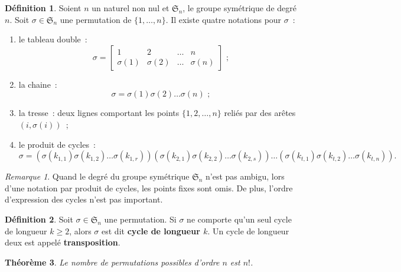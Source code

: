 \documentclass{article}
\newtheorem{thm}{Théorème}[section]
\theoremstyle{definition}
\newtheorem{déf}[thm]{Définition}
\theoremstyle{remark}
\newtheorem*{rmq}{Remarque}
\begin{document}
		\begin{déf} Soient $n$ un naturel non nul et $\mathfrak{S}_n$, le groupe symétrique de degré $n$. Soit $\sigma \in \mathfrak{S}_n$ une permutation de
		$\{1, \dotsc, n\}$. Il existe quatre notations pour $\sigma$~:

		\begin{enumerate}
			\item le tableau double~: \[\sigma = \begin{bmatrix}1 & 2 & \ldots & n \\ \sigma(1) & \sigma(2) & \ldots & \sigma(n) \end{bmatrix}\text{~;}\]
			\item la chaine~: \[\sigma = \sigma(1)\sigma(2)\ldots\sigma(n)\text{~;}\]
			\item la tresse~: deux lignes comportant les points $\{1, 2, \dotsc, n\}$ reliés par des arêtes $(i, \sigma(i))$~;
			\item le produit de cycles~: \[\sigma = \left(\sigma(k_{1, 1})\sigma(k_{1, 2})\ldots\sigma(k_{1, r})\right)\left(\sigma(k_{2, 1})\sigma(k_{2, 2})\ldots\sigma(k_{2, s})\right)\ldots\left(\sigma(k_{t, 1})\sigma(k_{t, 2})\ldots\sigma(k_{t, n})\right).\]
		\end{enumerate}\end{déf}

		\begin{rmq} Quand le degré du groupe symétrique $\mathfrak{S}_n$ n'est pas ambigu, lors d'une notation par produit de cycles, les points fixes sont omis. De plus,
		l'ordre d'expression des cycles n'est pas important. \end{rmq}

		\begin{déf} Soit $\sigma \in \mathfrak{S}_n$ une permutation. Si $\sigma$ ne comporte qu'un seul cycle de longueur $k \geq 2$, alors $\sigma$ est dit
		\textbf{cycle de longueur $k$}. Un cycle de longueur deux est appelé \textbf{transposition}. \end{déf}

		\begin{thm} Le nombre de permutations possibles d'ordre $n$ est $n!$. \end{thm}
\end{document}
